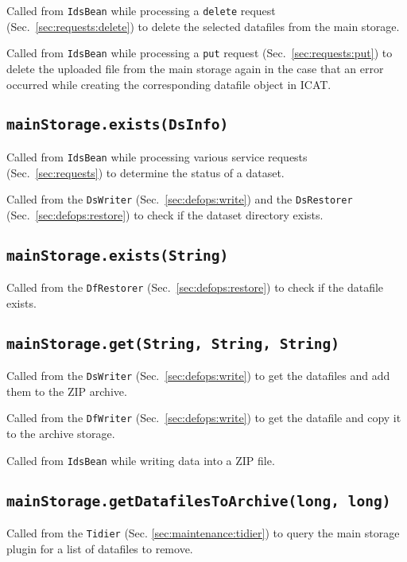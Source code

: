 \documentclass[paper=a4]{scrartcl}
\begin{document}
Called from \texttt{IdsBean} while processing a \texttt{delete}
request (Sec.\ \ref{sec:requests:delete}) to delete the selected
datafiles from the main storage.

Called from \texttt{IdsBean} while processing a \texttt{put} request
(Sec.\ \ref{sec:requests:put}) to delete the uploaded file from the
main storage again in the case that an error occurred while creating
the corresponding datafile object in ICAT.

\subsection{\texttt{mainStorage.exists(DsInfo)}}

Called from \texttt{IdsBean} while processing various service requests
(Sec.\ \ref{sec:requests}) to determine the status of a dataset.

Called from the \texttt{DsWriter} (Sec.\ \ref{sec:defops:write}) and
the \texttt{DsRestorer} (Sec.\ \ref{sec:defops:restore}) to check if
the dataset directory exists.

\subsection{\texttt{mainStorage.exists(String)}}

Called from the \texttt{DfRestorer} (Sec.\ \ref{sec:defops:restore})
to check if the datafile exists.

\subsection{\texttt{mainStorage.get(String, String, String)}}

Called from the \texttt{DsWriter} (Sec.\ \ref{sec:defops:write}) to
get the datafiles and add them to the ZIP archive.

Called from the \texttt{DfWriter} (Sec.\ \ref{sec:defops:write}) to
get the datafile and copy it to the archive storage.

Called from \texttt{IdsBean} while writing data into a ZIP file.

\subsection{\texttt{mainStorage.getDatafilesToArchive(long, long)}}

Called from the \texttt{Tidier} (Sec. \ref{sec:maintenance:tidier}) to
query the main storage plugin for a list of datafiles to remove.
\end{document}
